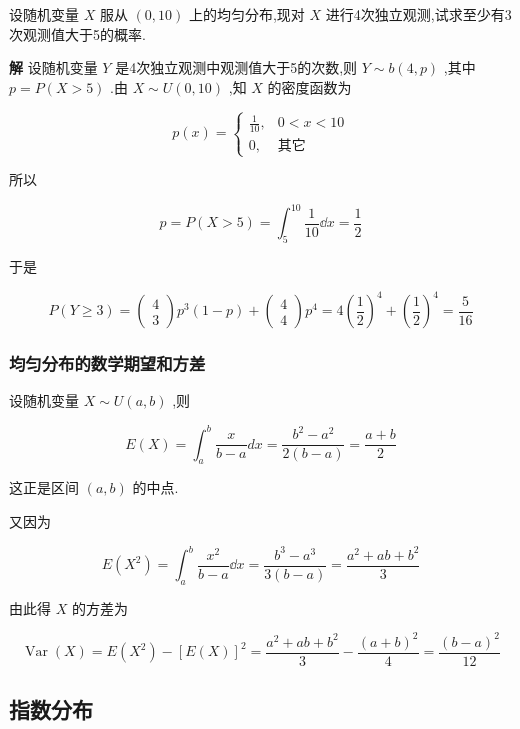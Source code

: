 \begin{example}\label{exam:2.5.4}
	设随机变量 $ X $ 服从 $ (0,10) $ 上的均匀分布,现对 $ X $ 进行4次独立观测,试求至少有3次观测值大于5的概率.
	
	\textbf{解} 设随机变量 $ Y $ 是4次独立观测中观测值大于5的次数,则 $ Y \sim b(4, p) $ ,其中 $ p=P(X>5) $ .由 $ X \sim U(0,10) $ ,知 $ X $ 的密度函数为
	
	\[
	p(x)=\left\{
	\begin{array}{ll}
	{\frac{1}{10},} & {0<x<10} \\ 
	{0,}            & {\text{其它}}
	\end{array}\right.
	\]
	
	所以
	
	\[
	p=P(X>5)=\int_{5}^{10} \frac{1}{10} \dd x=\frac{1}{2}
	\]
	
	于是
	
	\[
	P(Y \geqslant 3)=\left( \begin{array}{l}{4} \\ {3}\end{array}\right) p^{3}(1-p)+\left( \begin{array}{l}{4} \\ {4}\end{array}\right) p^{4}=4\left(\frac{1}{2}\right)^{4}+\left(\frac{1}{2}\right)^{4}=\frac{5}{16}
	\]
\end{example}

\subsubsection{均匀分布的数学期望和方差}

设随机变量 $ X \sim U(a, b) $ ,则

\[
E(X)=\int_{a}^{b} \frac{x}{b-a} d x=\frac{b^{2}-a^{2}}{2(b-a)}=\frac{a+b}{2}
\]

这正是区间 $ (a,b) $ 的中点.

又因为

\[
E\left(X^{2}\right)=\int_{a}^{b} \frac{x^{2}}{b-a} \dd x=\frac{b^{3}-a^{3}}{3(b-a)}=\frac{a^{2}+a b+b^{2}}{3}
\]

由此得 $ X $ 的方差为

\[
\operatorname{Var}(X)=E\left(X^{2}\right)-[E(X)]^{2}=\frac{a^{2}+a b+b^{2}}{3}-\frac{(a+b)^{2}}{4}=\frac{(b-a)^{2}}{12}
\]

\subsection{指数分布}\label{ssec:2.5.3}

